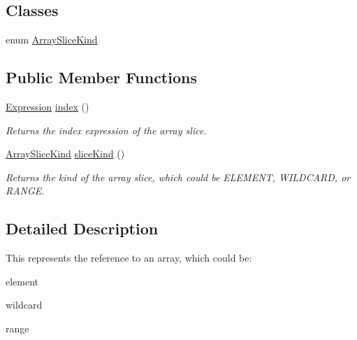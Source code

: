 \subsection*{Classes}
\begin{DoxyCompactItemize}
\item 
enum \hyperlink{enumedu_1_1udel_1_1cis_1_1vsl_1_1civl_1_1model_1_1IF_1_1expression_1_1reference_1_1ArraySliceReference_1_1ArraySliceKind}{Array\+Slice\+Kind}
\end{DoxyCompactItemize}
\subsection*{Public Member Functions}
\begin{DoxyCompactItemize}
\item 
\hyperlink{interfaceedu_1_1udel_1_1cis_1_1vsl_1_1civl_1_1model_1_1IF_1_1expression_1_1Expression}{Expression} \hyperlink{interfaceedu_1_1udel_1_1cis_1_1vsl_1_1civl_1_1model_1_1IF_1_1expression_1_1reference_1_1ArraySliceReference_ac892ea3304d86d193b122c6067040162}{index} ()
\begin{DoxyCompactList}\small\item\em Returns the index expression of the array slice. \end{DoxyCompactList}\item 
\hyperlink{enumedu_1_1udel_1_1cis_1_1vsl_1_1civl_1_1model_1_1IF_1_1expression_1_1reference_1_1ArraySliceReference_1_1ArraySliceKind}{Array\+Slice\+Kind} \hyperlink{interfaceedu_1_1udel_1_1cis_1_1vsl_1_1civl_1_1model_1_1IF_1_1expression_1_1reference_1_1ArraySliceReference_a689686b62c562db338eb678f6e74f557}{slice\+Kind} ()
\begin{DoxyCompactList}\small\item\em Returns the kind of the array slice, which could be E\+L\+E\+M\+E\+N\+T, W\+I\+L\+D\+C\+A\+R\+D, or R\+A\+N\+G\+E. \end{DoxyCompactList}\end{DoxyCompactItemize}


\subsection{Detailed Description}
This represents the reference to an array, which could be\+: 


\begin{DoxyItemize}
\item element 
\item wildcard 
\item range 
\end{DoxyItemize}


